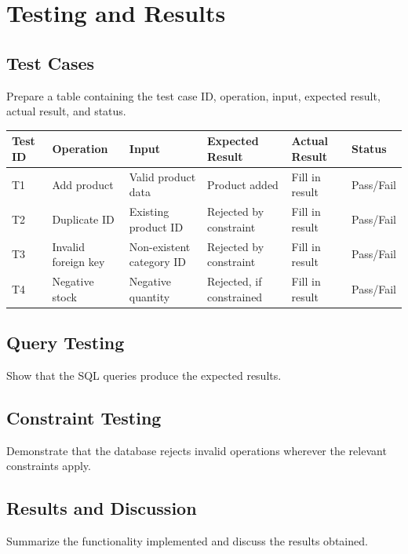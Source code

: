 \documentclass[12pt,a4paper]{report}
\begin{document}
\chapter{Testing and Results}

\section{Test Cases}
Prepare a table containing the test case ID, operation, input, expected result, actual result, and status.

\begin{center}
\small
\begin{longtable}{|p{1.1cm}|p{2.2cm}|p{2.2cm}|p{2.5cm}|p{2.5cm}|p{1.2cm}|}
\hline
\textbf{Test ID} & \textbf{Operation} & \textbf{Input} & \textbf{Expected Result} & \textbf{Actual Result} & \textbf{Status} \\
\hline
T1 & Add product & Valid product data & Product added & Fill in result & Pass/Fail \\
\hline
T2 & Duplicate ID & Existing product ID & Rejected by constraint & Fill in result & Pass/Fail \\
\hline
T3 & Invalid foreign key & Non-existent category ID & Rejected by constraint & Fill in result & Pass/Fail \\
\hline
T4 & Negative stock & Negative quantity & Rejected, if constrained & Fill in result & Pass/Fail \\
\hline
\end{longtable}
\end{center}

\section{Query Testing}
Show that the SQL queries produce the expected results.

\section{Constraint Testing}
Demonstrate that the database rejects invalid operations wherever the relevant constraints apply.

\section{Results and Discussion}
Summarize the functionality implemented and discuss the results obtained.
\end{document}
